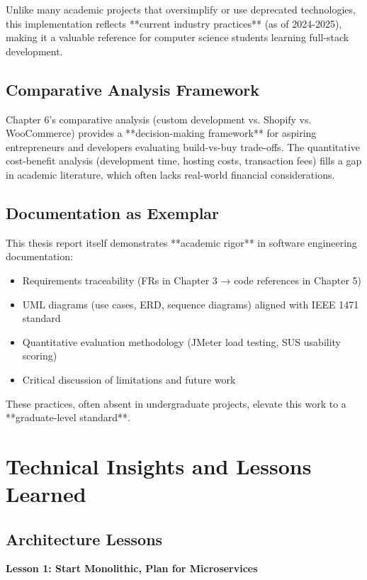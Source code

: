 Unlike many academic projects that oversimplify or use deprecated technologies, this implementation reflects **current industry practices** (as of 2024-2025), making it a valuable reference for computer science students learning full-stack development.

\subsection{Comparative Analysis Framework}

Chapter 6's comparative analysis (custom development vs. Shopify vs. WooCommerce) provides a **decision-making framework** for aspiring entrepreneurs and developers evaluating build-vs-buy trade-offs. The quantitative cost-benefit analysis (development time, hosting costs, transaction fees) fills a gap in academic literature, which often lacks real-world financial considerations.

\subsection{Documentation as Exemplar}

This thesis report itself demonstrates **academic rigor** in software engineering documentation:
\begin{itemize}
    \item Requirements traceability (FRs in Chapter 3 → code references in Chapter 5)
    \item UML diagrams (use cases, ERD, sequence diagrams) aligned with IEEE 1471 standard
    \item Quantitative evaluation methodology (JMeter load testing, SUS usability scoring)
    \item Critical discussion of limitations and future work
\end{itemize}

These practices, often absent in undergraduate projects, elevate this work to a **graduate-level standard**.

\section{Technical Insights and Lessons Learned}

\subsection{Architecture Lessons}

\textbf{Lesson 1: Start Monolithic, Plan for Microservices}

